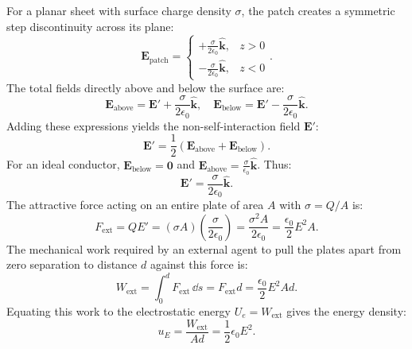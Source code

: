 For a planar sheet with surface charge density \(\sigma\), the patch creates a symmetric step discontinuity across its plane:
\begin{equation}
    \bm{E}_{\text{patch}} = \begin{cases} +\frac{\sigma}{2\epsilon_0}\hat{\bm{k}}, & z > 0 \\ -\frac{\sigma}{2\epsilon_0}\hat{\bm{k}}, & z < 0 \end{cases}.
\end{equation}
The total fields directly above and below the surface are:
\begin{equation}
    \bm{E}_{\text{above}} = \bm{E}' + \frac{\sigma}{2\epsilon_0}\hat{\bm{k}}, \quad \bm{E}_{\text{below}} = \bm{E}' - \frac{\sigma}{2\epsilon_0}\hat{\bm{k}}.
\end{equation}
Adding these expressions yields the non-self-interaction field \(\bm{E}'\):
\begin{equation}
    \bm{E}' = \frac{1}{2}\left(\bm{E}_{\text{above}} + \bm{E}_{\text{below}}\right).
\end{equation}
For an ideal conductor, \(\bm{E}_{\text{below}} = \bm{0}\) and \(\bm{E}_{\text{above}} = \frac{\sigma}{\epsilon_0}\hat{\bm{k}}\). Thus:
\begin{equation}
    \bm{E}' = \frac{\sigma}{2\epsilon_0}\hat{\bm{k}}.
\end{equation}
The attractive force acting on an entire plate of area \(A\) with \(\sigma = Q/A\) is:
\begin{equation}
    F_{\text{ext}} = Q E' = (\sigma A)\left(\frac{\sigma}{2\epsilon_0}\right) = \frac{\sigma^2 A}{2\epsilon_0} = \frac{\epsilon_0}{2}E^2 A.
\end{equation}
The mechanical work required by an external agent to pull the plates apart from zero separation to distance \(d\) against this force is:
\begin{equation}
    W_{\text{ext}} = \int_0^d F_{\text{ext}}\,\dd s = F_{\text{ext}} d = \frac{\epsilon_0}{2}E^2 A d.
\end{equation}
Equating this work to the electrostatic energy \(U_e = W_{\text{ext}}\) gives the energy density:
\begin{equation}
    u_E = \frac{W_{\text{ext}}}{A d} = \frac{1}{2}\epsilon_0 E^2.
\end{equation}

